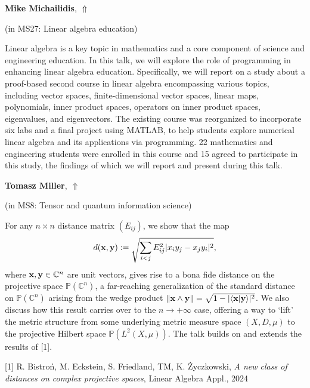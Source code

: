\documentclass[ILAS2025-program.tex]{subfiles}
\begin{document}
\hypertarget{down0292}{}\begin{ilasabstract}
    
\textbf{Mike Michailidis},  \hfill \hyperlink{up0292}{$\Uparrow$}
    
    
(in {\color{mstitle}MS27: Linear algebra education})
        
\mtskip
    Linear algebra is a key topic in mathematics and a core component of science and engineering education. In this talk, we will explore the role of programming in enhancing linear algebra education. Specifically, we will report on a study about a proof-based second course in linear algebra encompassing various topics, including vector spaces, finite-dimensional vector spaces, linear maps, polynomials, inner product spaces, operators on inner product spaces, eigenvalues, and eigenvectors. The existing course was reorganized to incorporate six labs and a final project using MATLAB, to help students explore numerical linear algebra and its applications via programming. 22 mathematics and engineering students were enrolled in this course and 15 agreed to participate in this study, the findings of which we will report and present during this talk. 

\end{ilasabstract}
    

\hypertarget{down0019}{}\begin{ilasabstract}
    
\textbf{Tomasz Miller},  \hfill \hyperlink{up0019}{$\Uparrow$}
    
    
(in {\color{mstitle}MS8: Tensor and quantum information science})
        
\mtskip
    For any $n \times n$ distance matrix $(E_{ij})$, we show that the map
\begin{align*}
d(\textup{\textbf{x}},\textup{\textbf{y}}) := \sqrt{\sum_{i<j}E_{ij}^2|x_iy_j - x_jy_i|^2},
\end{align*}
where $\textup{\textbf{x}},\textup{\textbf{y}} \in {\mathbb C}^n$ are unit vectors, gives rise to a bona fide distance on the projective space ${\mathbb P}({\mathbb C}^n)$, a far-reaching generalization of the standard distance on ${\mathbb P}({\mathbb C}^n)$ arising from the wedge product $\|\textup{\textbf{x}} \wedge \textup{\textbf{y}}\| = \sqrt{1 - |\langle \textup{\textbf{x}} | \textup{\textbf{y}} \rangle|^2}$. We also discuss how this result carries over to the $n \rightarrow +\infty$ case, offering a way to `lift' the metric structure from some underlying metric measure space $(X,D,\mu)$ to the projective Hilbert space ${\mathbb P}(L^2(X,\mu))$. The talk builds on and extends the results of [1].

[1] R. Bistro\'{n}, M. Eckstein, S. Friedland, TM, K. \.{Z}yczkowski, \textit{A new class of distances on complex projective spaces}, Linear Algebra Appl., 2024
\end{ilasabstract}
    
\end{document}
